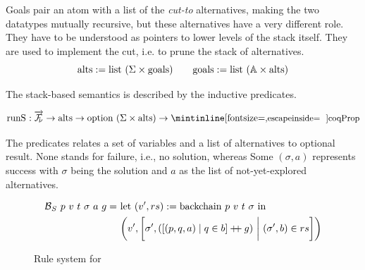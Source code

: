 Goals pair an atom with a list of the \emph{cut-to} alternatives, 
making the two datatypes mutually recursive, but these alternatives
have a very different role. They have to be understood
as pointers to lower levels of the stack itself.
They are used to implement the cut, i.e. to prune the stack of alternatives.
$$\mathrm{alts} := \mathrm{list}\ (\Sigma \times \mathrm{goals})  \qquad \mathrm{goals} := \mathrm{list}\ (\mathbb{A} \times \mathrm{alts})$$

The stack-based semantics is described by the \runS inductive
predicates.

$$\mathrm{\runS} : \vecL{\FV} \to \mathrm{alts} \to \mathrm{option}\ (\Sigma \times \mathrm{alts}) \to \cI{Prop}$$

\noindent
The \runS predicates relates a set of variables and a
list of alternatives to optional result. None stands for failure,
i.e., no solution, whereas Some $(\sigma, a)$ represents success with $\sigma$
being the solution and $a$ as the list of not-yet-explored
alternatives.
\begin{figure}
   \begin{align*}
  \backchainS\ p\ v\ t\ \sigma\ a\ g =\ &
  \mathrm{let}\ (v', rs) := \mathrm{backchain}\ p\ v\ t\ \sigma\ \mathrm{in}\\
  &\bigg(v', \bigg[
  \sigma',
  (
    [(p, q, a) \mid q \in b] \mappend g
  )
  \ \bigg|\ 
  (\sigma', b) \in rs
  \bigg]\bigg)
  \end{align*}

  

  \caption{Rule system for \runS}
  \label{fig:nur-rules}
\end{figure}


